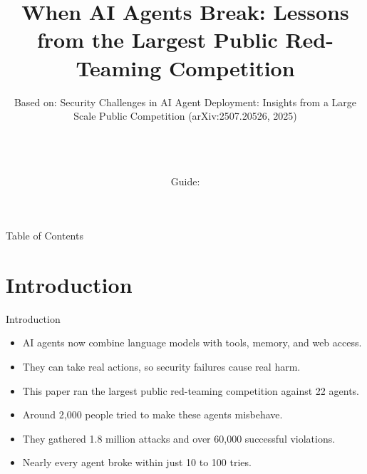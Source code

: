 \documentclass[10pt]{beamer}
\title[B.Tech Seminar]{When AI Agents Break: Lessons from the Largest Public Red-Teaming Competition}
\subtitle{Based on: Security Challenges in AI Agent Deployment: Insights from a Large Scale Public Competition (arXiv:2507.20526, 2025)}
\author[\studentname\ (\shortinst)]{\studentname \\ \small \rollno \\ \small \rollclass \\ \small Guide: \guidename}
\institute[]{\deptname \\ \collegename}
\date{\seminardate}
\begin{document}
\begin{frame}[plain]
  \titlepage
\end{frame}
\begin{frame}{Table of Contents}
  \tableofcontents
\end{frame}
\section{Introduction}
\begin{frame}{Introduction}
\begin{itemize}
  \item AI agents now combine language models with tools, memory, and web access.
  \item They can take real actions, so security failures cause real harm.
  \item This paper ran the largest public red-teaming competition against 22 agents.
  \item Around 2,000 people tried to make these agents misbehave.
  \item They gathered 1.8 million attacks and over 60,000 successful violations.
  \item Nearly every agent broke within just 10 to 100 tries.
\end{itemize}
\end{frame}
\end{document}
